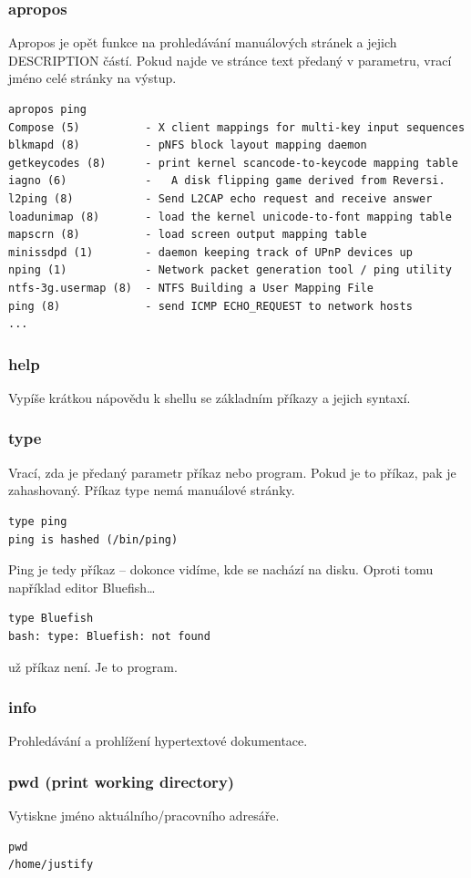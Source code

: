 \documentclass{article}
\begin{document}
\subsubsection{apropos}
Apropos je opět funkce na prohledávání manuálových stránek a jejich DESCRIPTION částí. Pokud najde ve stránce text předaný v parametru, vrací jméno celé stránky na výstup.
\begin{verbatim}
apropos ping
Compose (5)          - X client mappings for multi-key input sequences
blkmapd (8)          - pNFS block layout mapping daemon
getkeycodes (8)      - print kernel scancode-to-keycode mapping table
iagno (6)            -	 A disk flipping game derived from Reversi.
l2ping (8)           - Send L2CAP echo request and receive answer
loadunimap (8)       - load the kernel unicode-to-font mapping table
mapscrn (8)          - load screen output mapping table
minissdpd (1)        - daemon keeping track of UPnP devices up
nping (1)            - Network packet generation tool / ping utility
ntfs-3g.usermap (8)  - NTFS Building a User Mapping File
ping (8)             - send ICMP ECHO_REQUEST to network hosts
...
\end{verbatim}

\subsubsection{help}
Vypíše krátkou nápovědu k shellu se základním příkazy a jejich syntaxí.

\subsubsection{type}
Vrací, zda je předaný parametr příkaz nebo program. Pokud je to příkaz, pak je zahashovaný. Příkaz type nemá manuálové stránky.
\begin{verbatim}
type ping
ping is hashed (/bin/ping)
\end{verbatim}
Ping je tedy příkaz -- dokonce vidíme, kde se nachází na disku. Oproti tomu například editor Bluefish\dots
\begin{verbatim}
type Bluefish
bash: type: Bluefish: not found
\end{verbatim}
už příkaz není. Je to program.

\subsubsection{info}	
Prohledávání a prohlížení hypertextové dokumentace.

\subsubsection{pwd (print working directory)}
Vytiskne jméno aktuálního/pracovního adresáře.
\begin{verbatim}
pwd
/home/justify
\end{verbatim}
\end{document}
